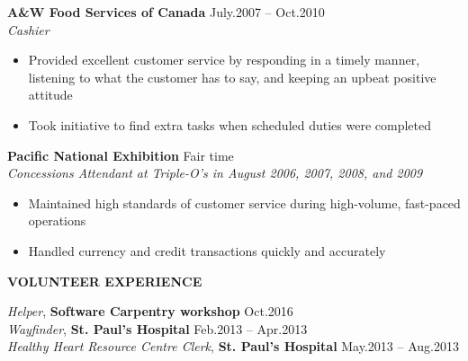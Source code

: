 \documentclass{res}
\renewcommand{\section}[1]{%
  \vspace{0.3in}%
  \centerline{\uppercase{\bf{#1}}}%
  \vspace{-6pt}}
\newcommand{\linehead}[2]{%
  {\bf #1} \hfill #2\\}
\newcommand{\linetitle}[1]{%
  {\sl #1}}
\newcommand{\linevolunteer}[3]{%
  {\sl #3}, {\bf #2} \hfill #1\\[.5ex]}
\begin{document}
\begin{resume}
\linehead{A\&W Food Services of Canada}{July.2007 -- Oct.2010}
\linetitle{Cashier}
\begin{itemize}
  \item Provided excellent customer service by responding in a timely manner, listening to what the customer has to say, and keeping an upbeat positive attitude
  \item Took initiative to find extra tasks when scheduled duties were completed
\end{itemize}

\linehead{Pacific National Exhibition}{Fair time}
\linetitle{Concessions Attendant at Triple-O's in August 2006, 2007, 2008, and 2009}
\begin{itemize}
  \item Maintained high standards of customer service during high-volume, fast-paced operations
  \item Handled currency and credit transactions quickly and accurately
\end{itemize}

\section{Volunteer experience}

\linevolunteer{Oct.2016}{%
  Software Carpentry workshop}{%
  Helper}
\linevolunteer{Feb.2013 -- Apr.2013}{%
  St. Paul's Hospital}{%
  Wayfinder}
\linevolunteer{May.2013 -- Aug.2013}{%
  St. Paul's Hospital}{%
  Healthy Heart Resource Centre Clerk}


\end{resume}
\end{document}

